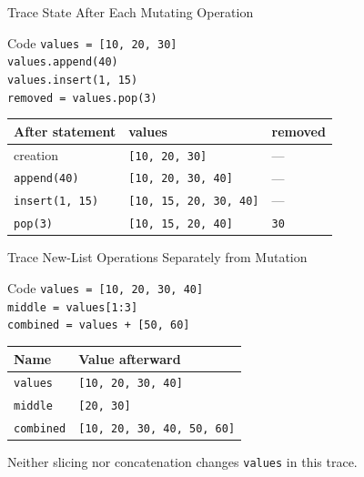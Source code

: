 \documentclass[aspectratio=169,10pt]{beamer}
\begin{document}
\begin{frame}{Trace State After Each Mutating Operation}
  \begin{block}{Code}
    \texttt{values = [10, 20, 30]}\\
    \texttt{values.append(40)}\\
    \texttt{values.insert(1, 15)}\\
    \texttt{removed = values.pop(3)}
  \end{block}

  \begin{center}
    \renewcommand{\arraystretch}{1.28}
    \begin{tabular}{l|l|l}
      \textbf{After statement} & \textbf{values} & \textbf{removed} \\\hline
      creation & \texttt{[10, 20, 30]} & --- \\
      \texttt{append(40)} & \texttt{[10, 20, 30, 40]} & --- \\
      \texttt{insert(1, 15)} & \texttt{[10, 15, 20, 30, 40]} & --- \\
      \texttt{pop(3)} & \texttt{[10, 15, 20, 40]} & \texttt{30}
    \end{tabular}
  \end{center}
\end{frame}

\begin{frame}{Trace New-List Operations Separately from Mutation}
  \begin{block}{Code}
    \texttt{values = [10, 20, 30, 40]}\\
    \texttt{middle = values[1:3]}\\
    \texttt{combined = values + [50, 60]}
  \end{block}

  \begin{center}
    \renewcommand{\arraystretch}{1.3}
    \begin{tabular}{l|l}
      \textbf{Name} & \textbf{Value afterward} \\\hline
      \texttt{values} & \texttt{[10, 20, 30, 40]} \\
      \texttt{middle} & \texttt{[20, 30]} \\
      \texttt{combined} & \texttt{[10, 20, 30, 40, 50, 60]}
    \end{tabular}
  \end{center}

  \begin{keyidea}
    Neither slicing nor concatenation changes \texttt{values} in this trace.
  \end{keyidea}
\end{frame}
\end{document}
